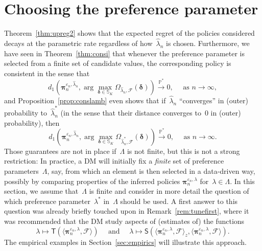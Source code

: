 \documentclass[11pt, a4paper]{article}
\newcommand{\cps}{\xrightarrow{\mathbb{P}^*}}
\theoremstyle{definition}
\begin{document}
\section{Choosing the preference parameter}\label{sec:tune}

Theorem~\ref{thm:upreg2} shows that the expected regret of the policies considered decays at the parametric rate regardless of how~$\hat{\lambda}_n$ is chosen. Furthermore, we have seen in Theorem~\ref{thm:consi} that whenever the preference parameter is selected from a finite set of candidate values, the corresponding policy is consistent in the sense that $$d_1\left(\bm{\pi}_{n}^{\varepsilon_n, \hat{\lambda}_{n}}, \arg \max_{\bm{\delta}\in\mathbb{S}_K} \Omega_{  \hat{\lambda}_{n}, \mathcal{F}}(\bm{\delta})\right) \cps 0, \quad \text{ as } n \to \infty,$$ and Proposition~\ref{prop:conslamb} even shows that if~$\hat{\lambda}_n$ ``converges'' in (outer) probability to~$\hat{\lambda}^*_n$ (in the sense that their distance converges to~$0$ in (outer) probability), then $$d_1\left(\bm{\pi}_{n}^{\varepsilon_n, \hat{\lambda}_{n}}, \arg \max_{\bm{\delta}\in\mathbb{S}_K} \Omega_{  \hat{\lambda}_n^*, \mathcal{F}}(\bm{\delta})\right) \cps 0, \quad \text{ as } n \to \infty.$$ Those guarantees are not in place if~$\Lambda$ is not finite, but this is not a strong restriction: In practice, a DM will initially fix a \emph{finite} set of preference parameters~$\Lambda$, say, from which an element is then selected in a data-driven way, possibly by comparing properties of the inferred policies $\bm{\pi}_{n}^{\varepsilon_n, \lambda}$ for~$\lambda \in \Lambda$. In this section, we assume that~$\Lambda$ is finite and consider in more detail the question of which preference parameter~$\lambda^*$ in~$\Lambda$ should be used. A first answer to this question was already briefly touched upon in Remark~\ref{rem:tunefirst}, where it was recommended that the DM study aspects of (estimates of) the functions~$$\lambda \mapsto \mathsf{T}\left(\langle \bm{\pi}_{n}^{\varepsilon_n, \lambda}, \mathcal{F} \rangle \right) \quad \text{ and } \quad \lambda \mapsto \mathsf{S} \left(\langle \bm{\pi}_{n}^{\varepsilon_n, \lambda}, \mathcal{F} \rangle_z, \langle \bm{\pi}_{n}^{\varepsilon_n, \lambda}, \mathcal{F} \rangle \right).$$ The empirical examples in Section~\ref{sec:empirics} will illustrate this approach.
\end{document}
